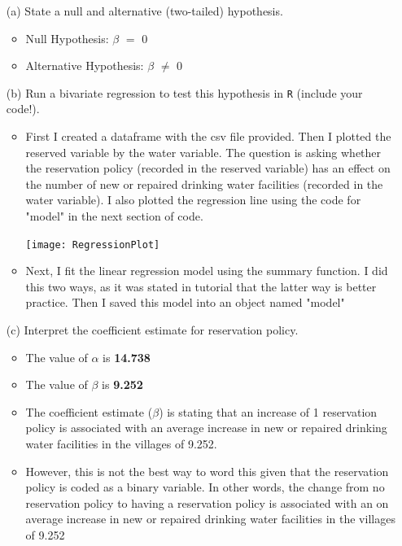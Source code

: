 \documentclass[12pt,letterpaper]{article}
\begin{document}
\newpage
\begin{enumerate}
	\item [(a)] State a null and alternative (two-tailed) hypothesis. 
	
		\begin{itemize}
			\item {Null Hypothesis: $\beta$ $=$ 0}
			\item {Alternative Hypothesis: $\beta$ $\neq$ 0}
		\end{itemize}
	
	\vspace{0cm}
	\item [(b)] Run a bivariate regression to test this hypothesis in \texttt{R} (include your code!).
			
		\begin{itemize}
			\item First I created a dataframe with the csv file provided. Then I plotted the reserved variable by the water variable. The question is asking whether the reservation policy (recorded in the reserved variable) has an effect on the number of new or repaired drinking water facilities (recorded in the water variable). I also plotted the regression line using the code for "model" in the next section of code.
				
				
				\texttt{[image: RegressionPlot]}\hfill
			\item Next, I fit the linear regression model using the summary function. I did this two ways, as it was stated in tutorial that the latter way is better practice. Then I saved this model into an object named "model"
				
				
				
		\end{itemize}
			
			
	\vspace{0cm}
	\item [(c)] Interpret the coefficient estimate for reservation policy. 
		\begin{itemize}
			\item The value of $\alpha$ is \textbf{14.738}
			\item The value of $\beta$ is \textbf{9.252}
			\item The coefficient estimate ($\beta$) is stating that an increase of 1 reservation policy is associated with an average increase in new or repaired drinking water facilities in the villages of 9.252. 
			\item However, this is not the best way to word this given that the reservation policy is coded as a binary variable. In other words, the change from no reservation policy to having a reservation policy is associated with an on average increase in new or repaired drinking water facilities in the villages of 9.252
		\end{itemize}
\end{enumerate}
\end{document}
